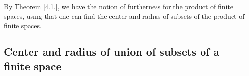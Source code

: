 \documentclass[12pt]{amsart}
\begin{document}


	By Theorem \ref{4.1.}, we have the notion of furtherness for the product of finite spaces, using that one can find the center and radius of subsets of the product of finite spaces.
		


\subsection{\textbf{Center and radius of union of subsets of a finite space}}
\end{document}

